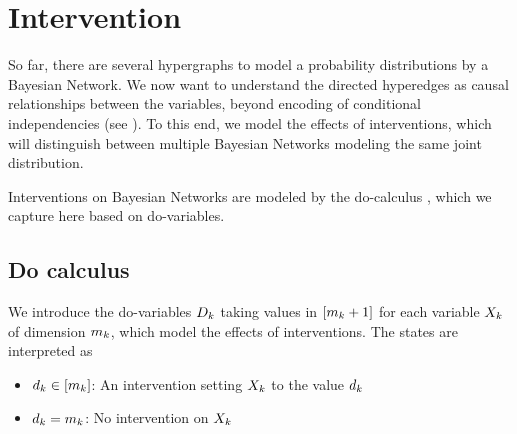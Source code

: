 \section{Intervention}

So far, there are several hypergraphs to model a probability distributions by a Bayesian Network.
We now want to understand the directed hyperedges as causal relationships between the variables, beyond encoding of conditional independencies (see ).
To this end, we model the effects of interventions, which will distinguish between multiple Bayesian Networks modeling the same joint distribution.



Interventions on Bayesian Networks are modeled by the do-calculus \cite{pearl_causality_2009}, which we capture here based on do-variables.

\subsection{Do calculus}

We introduce the do-variables $D_{k}$ taking values in $[m_{k}+1]$ for each variable $X_{k}$ of dimension $m_{k}$, which model the effects of interventions.
The states are interpreted as
\begin{itemize}
    \item $d_{k}\in[m_{k}]$: An intervention setting $X_{k}$ to the value $d_{k}$
    \item $d_{k}=m_{k}$: No intervention on $X_{k}$
\end{itemize}

